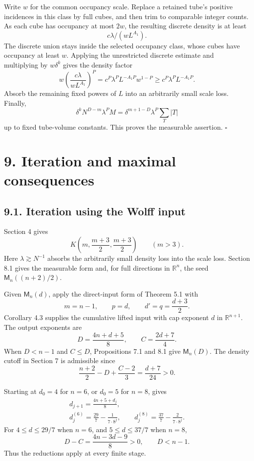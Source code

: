 \documentclass[
  11pt,
  a4paper,
]{article}
\begin{document}
Write \(w\) for the common occupancy scale. Replace a retained tube's
positive incidences in this class by full cubes, and then trim to
comparable integer counts. As each cube has occupancy at most \(2w\),
the resulting discrete density is at least \[
 c\lambda/(wL^{A_1}).
\] The discrete union stays inside the selected occupancy class, whose
cubes have occupancy at least \(w\). Applying the unrestricted discrete
estimate and multiplying by \(w\delta^k\) gives the density factor \[
 w\left(\frac{c\lambda}{wL^{A_1}}\right)^P
 =c^P\lambda^PL^{-A_1P}w^{1-P}
 \ge c^P\lambda^PL^{-A_1P}.
\] Absorb the remaining fixed powers of \(L\) into an arbitrarily small
scale loss. Finally, \[
 \delta^kN^{D-m}\lambda^PM
 =\delta^{m+1-D}\lambda^P\sum_T|T|
\] up to fixed tube-volume constants. This proves the measurable
assertion. \(\square\)

\hypertarget{iteration-and-maximal-consequences}{%
\section{9. Iteration and maximal
consequences}\label{iteration-and-maximal-consequences}}

\hypertarget{iteration-using-the-wolff-input}{%
\subsection{9.1. Iteration using the Wolff
input}\label{iteration-using-the-wolff-input}}

Section 4 gives \[
 K\left(m,\frac{m+3}{2},\frac{m+3}{2}\right)
 \qquad(m>3).
\] Here \(\lambda\gtrsim N^{-1}\) absorbs the arbitrarily small density
loss into the scale loss. Section 8.1 gives the measurable form and, for
full directions in \(\mathbb R^n\), the seed \(\mathsf M_n((n+2)/2)\).

Given \(\mathsf M_n(d)\), apply the direct-input form of Theorem 5.1
with \[
 m=n-1,\qquad p=d,\qquad d'=q=\frac{d+3}{2}.
\] Corollary 4.3 supplies the cumulative lifted input with cap exponent
\(d\) in \(\mathbb R^{n+1}\). The output exponents are \[
 D=\frac{4n+d+5}{8},\qquad C=\frac{2d+7}{4}.
                                                               \tag{9.1}\label{eq:9.1}
\] When \(D<n-1\) and \(C\le D\), Propositions 7.1 and 8.1 give
\(\mathsf M_n(D)\). The density cutoff in Section 7 is admissible since
\[
 \frac{n+2}{2}-D+\frac{C-2}{3}
 =\frac{d+7}{24}>0.                               \tag{9.2}\label{eq:9.2}
\]

Starting at \(d_0=4\) for \(n=6\), or \(d_0=5\) for \(n=8\), gives \[
 \begin{gathered}
 d_{j+1}=\frac{4n+5+d_j}{8},\\
 d_j^{(6)}=\frac{29}{7}-\frac{1}{7\cdot8^j},\qquad
 d_j^{(8)}=\frac{37}{7}-\frac{2}{7\cdot8^j}.
                                                               \tag{9.3}\label{eq:9.3}
 \end{gathered}
\] For \(4\le d\le29/7\) when \(n=6\), and \(5\le d\le37/7\) when
\(n=8\), \[
 D-C=\frac{4n-3d-9}{8}>0,
 \qquad D<n-1.
\] Thus the reductions apply at every finite stage.
\end{document}
